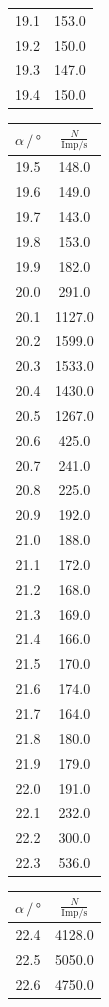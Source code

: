 \begin{table}
\begin{tabular}[t]{cc}
  19.1 & 153.0  \\
  19.2 & 150.0  \\
  19.3 & 147.0  \\
  19.4 & 150.0\\
  \bottomrule
  \end{tabular}
  \begin{tabular}[t]{cc}
  \toprule
  $\alpha \,/\, \si{\degree} $ & $\frac{N}{\text{Imp}/\si{\second}}$ \\
  \midrule
  19.5 & 148.0\\
  19.6 & 149.0\\
  19.7 & 143.0\\
  19.8 & 153.0\\
  19.9 & 182.0\\
  20.0 & 291.0\\
  20.1 & 1127.0\\
  20.2 & 1599.0\\
  20.3 & 1533.0\\
  20.4 & 1430.0\\
  20.5 & 1267.0\\
  20.6 & 425.0\\
  20.7 & 241.0\\
  20.8 & 225.0\\
  20.9 & 192.0\\
  21.0 & 188.0\\
  21.1 & 172.0\\
  21.2 & 168.0\\
  21.3 & 169.0\\
  21.4 & 166.0\\
  21.5 & 170.0\\
  21.6 & 174.0\\
  21.7 & 164.0\\
  21.8 & 180.0\\
  21.9 & 179.0\\
  22.0 & 191.0\\
  22.1 & 232.0\\
  22.2 & 300.0\\
  22.3 & 536.0\\
  \bottomrule
  \end{tabular}
  \begin{tabular}[t]{cc}
  \toprule
  $\alpha \,/\, \si{\degree} $ & $\frac{N}{\text{Imp}/\si{\second}}$ \\
  \midrule
  22.4 & 4128.0\\
  22.5 & 5050.0\\
  22.6 & 4750.0\\

\end{tabular}
\end{table}
